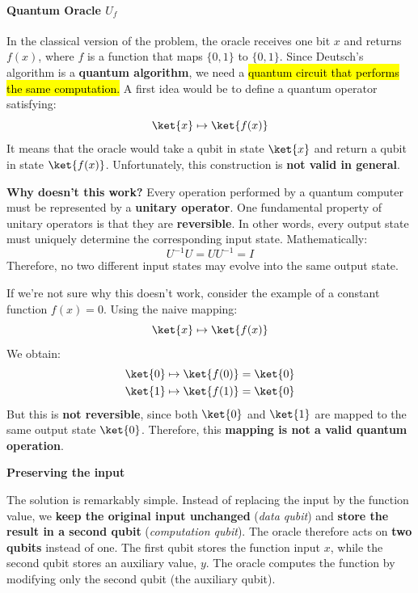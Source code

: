 \paragraph{Quantum Oracle \texorpdfstring{$U_f$}{Uf}}\label{ex:quantum-oracle-uf}

In the classical version of the problem, the oracle receives one bit $x$ and returns $f(x)$, where $f$ is a function that maps $\{0,1\}$ to $\{0,1\}$. Since Deutsch's algorithm is a \textbf{quantum algorithm}, we need a \hl{quantum circuit that performs the same computation.} A first idea would be to define a quantum operator satisfying:
\begin{equation*}
    \ket{x} \mapsto \ket{f(x)}
\end{equation*}
It means that the oracle would take a qubit in state $\ket{x}$ and return a qubit in state $\ket{f(x)}$. Unfortunately, this construction is \textbf{not valid in general}.

\highspace
\textcolor{Green3}{ \textbf{Why doesn't this work?}} Every operation performed by a quantum computer must be represented by a \textbf{unitary operator}. One fundamental property of unitary operators is that they are \textbf{reversible}. In other words, every output state must uniquely determine the corresponding input state. Mathematically:
\begin{equation*}
    U^{-1}U = UU^{-1} = I
\end{equation*}
Therefore, no two different input states may evolve into the same output state.

\highspace
If we're not sure why this doesn't work, consider the example of a constant function $f(x) = 0$. Using the naive mapping:
\begin{equation*}
    \ket{x} \mapsto \ket{f(x)}
\end{equation*}
\textcolor{Red2}{} We obtain:
\begin{align*}
    \ket{0} &\mapsto \ket{f(0)} = \ket{0} \\
    \ket{1} &\mapsto \ket{f(1)} = \ket{0}
\end{align*}
But this is \textbf{not reversible}, since both $\ket{0}$ and $\ket{1}$ are mapped to the same output state $\ket{0}$. Therefore, this \textbf{mapping is not a valid quantum operation}.

\highspace
\begin{flushleft}
    \textcolor{Green3}{ \textbf{Preserving the input}}
\end{flushleft}
The solution is remarkably simple. Instead of replacing the input by the function value, we \textbf{keep the original input unchanged} (\emph{data qubit}) and \textbf{store the result in a second qubit} (\emph{computation qubit}). The oracle therefore acts on \textbf{two qubits} instead of one. The first qubit stores the function input $x$, while the second qubit stores an auxiliary value, $y$. The oracle computes the function by modifying only the second qubit (the auxiliary qubit).

